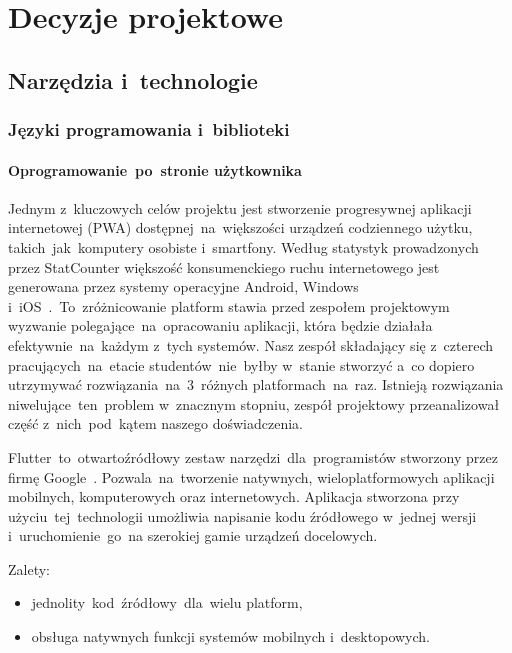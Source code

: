 
\chapter{Decyzje projektowe}
\label{ch:decyzje-projektowe}

\section{Narzędzia i~technologie}
\label{sec:narzedzia-i-technologie}

\subsection{Języki programowania i~biblioteki}
\label{subsec:jezyki-programowania-i-biblioteki}

\subsubsection{Oprogramowanie~po~stronie użytkownika}
\indent Jednym z~kluczowych celów projektu jest stworzenie progresywnej aplikacji internetowej (PWA) dostępnej~na~większości urządzeń codziennego użytku, takich~jak~komputery osobiste i~smartfony.
Według statystyk prowadzonych przez StatCounter większość konsumenckiego ruchu internetowego jest generowana przez systemy operacyjne Android, Windows i~iOS~\cite{statcounter-os-shares}\@.~To~zróżnicowanie platform stawia przed zespołem projektowym wyzwanie polegające~na~opracowaniu aplikacji, która będzie działała efektywnie~na~każdym z~tych systemów.
Nasz zespół składający się z~czterech pracujących~na~etacie studentów~nie~byłby w~stanie stworzyć a~co dopiero utrzymywać rozwiązania~na~3~różnych platformach~na~raz.
Istnieją rozwiązania niwelujące~ten~problem w~znacznym stopniu, zespół projektowy przeanalizował część z~nich~pod~kątem naszego doświadczenia.

\indent Flutter~to~otwartoźródłowy zestaw narzędzi~dla~programistów stworzony przez firmę Google~\cite{flutter-quick-start}.
Pozwala~na~tworzenie natywnych, wieloplatformowych aplikacji mobilnych, komputerowych oraz internetowych.
Aplikacja stworzona przy użyciu~tej~technologii umożliwia napisanie kodu źródłowego w~jednej wersji i~uruchomienie~go~na szerokiej gamie urządzeń docelowych.

Zalety:
\begin{itemize}
    \item jednolity~kod~źródłowy~dla~wielu platform,
    \item obsługa natywnych funkcji systemów mobilnych i~desktopowych.
\end{itemize}

